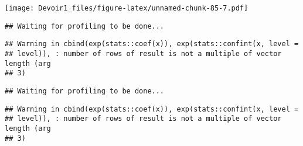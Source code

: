 \documentclass[]{article}
\newenvironment{Shaded}{\begin{snugshade}}{\end{snugshade}}
\newcommand{\KeywordTok}[1]{\textcolor[rgb]{0.13,0.29,0.53}{\textbf{#1}}}
\newcommand{\DataTypeTok}[1]{\textcolor[rgb]{0.13,0.29,0.53}{#1}}
\newcommand{\DecValTok}[1]{\textcolor[rgb]{0.00,0.00,0.81}{#1}}
\newcommand{\StringTok}[1]{\textcolor[rgb]{0.31,0.60,0.02}{#1}}
\newcommand{\OperatorTok}[1]{\textcolor[rgb]{0.81,0.36,0.00}{\textbf{#1}}}
\newcommand{\NormalTok}[1]{#1}
\begin{document}
\texttt{[image: Devoir1\_files/figure-latex/unnamed-chunk-85-7.pdf]}

\begin{Shaded}
\end{Shaded}

\begin{verbatim}
## Waiting for profiling to be done...
\end{verbatim}

\begin{verbatim}
## Warning in cbind(exp(stats::coef(x)), exp(stats::confint(x, level =
## level)), : number of rows of result is not a multiple of vector length (arg
## 3)
\end{verbatim}

\begin{verbatim}
## Waiting for profiling to be done...
\end{verbatim}

\begin{verbatim}
## Warning in cbind(exp(stats::coef(x)), exp(stats::confint(x, level =
## level)), : number of rows of result is not a multiple of vector length (arg
## 3)
\end{verbatim}
\end{document}
